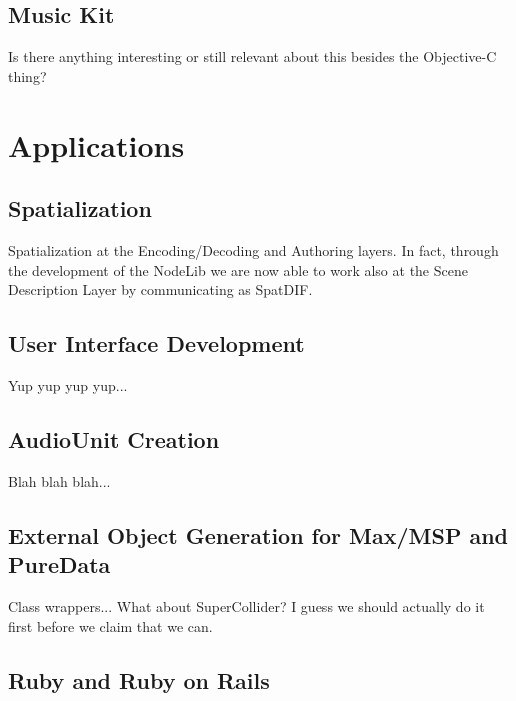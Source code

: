 \documentclass[twoside,10pt]{article}
\begin{document}

\subsection{Music Kit} %

Is there anything interesting or still relevant about this besides the Objective-C thing? \cite{Jaffe:1989}




\section{Applications} %

\subsection{Spatialization}

Spatialization at the Encoding/Decoding and Authoring layers\cite{Peters:2009}.  In fact, through the development of the NodeLib we are now able to work also at the Scene Description Layer by communicating as SpatDIF\cite{Peters:2008spatdif}.

\subsection{User Interface Development}

Yup yup yup yup...

\subsection{AudioUnit Creation}

Blah blah blah...

\subsection{External Object Generation for Max/MSP and PureData}

Class wrappers...  What about SuperCollider?  I guess we should actually do it first before we claim that we can.

\subsection{Ruby and Ruby on Rails}
\end{document}
